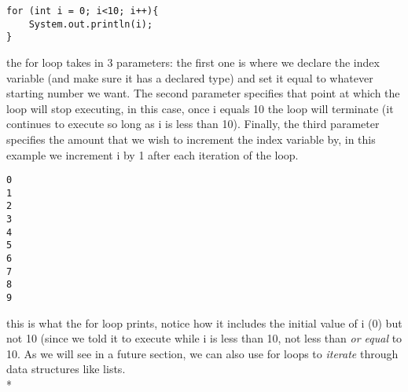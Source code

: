 \documentclass[14pt]{extreport}%
\begin{document}
\begin{lstlisting}
for (int i = 0; i<10; i++){
    System.out.println(i);
}
\end{lstlisting}{}
the for loop takes in 3 parameters: the first one is where we declare the index variable (and make sure it has a declared type) and set it equal to whatever starting number we want. The second parameter specifies that point at which the loop will stop executing, in this case, once i equals 10 the loop will terminate (it continues to execute so long as i is less than 10). Finally, the third parameter specifies the amount that we wish to increment the index variable by, in this example we increment i by 1 after each iteration of the loop.
\begin{lstlisting}
0
1
2
3
4
5
6
7
8
9
\end{lstlisting}{}
this is what the for loop prints, notice how it includes the initial value of i (0) but not 10 (since we told it to execute while i is less than 10, not less than \textit{or equal} to 10. As we will see in a future section, we can also use for loops to \textit{iterate} through data structures like lists. \\*
\end{document}
